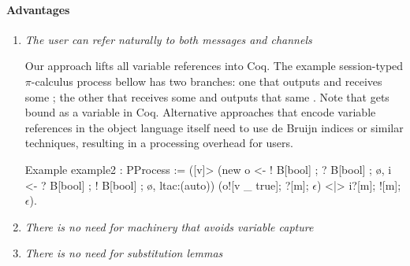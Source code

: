 \documentclass{mproj}
\newcommand{\picalc}{$\pi$-calculus}
\begin{document}
\paragraph{Advantages}
\begin{enumerate}
    \item \emph{The user can refer naturally to both messages and channels}

    Our approach lifts all variable references into Coq. The example session-typed \picalc{} process bellow has two branches: one that outputs  and receives some ; the other that receives some  and outputs that same . Note that  gets bound as a variable in Coq. Alternative approaches that encode variable references in the object language itself need to use de Bruijn indices \cite{deBruijn1972} or similar techniques, resulting in a processing overhead for users.
        
    \begin{coq}
    Example example2 : PProcess := ([v]>
        (new o <- ! B[bool] ; ? B[bool] ; ø,
             i <- ? B[bool] ; ! B[bool] ; ø,
             ltac:(auto))
        (o![v _ true]; ?[m]; $\epsilon$) <|> i?[m]; ![m]; $\epsilon$).
    \end{coq}

    \item \emph{There is no need for machinery that avoids variable capture}


    \item \emph{There is no need for substitution lemmas}

\end{enumerate}
\end{document}
